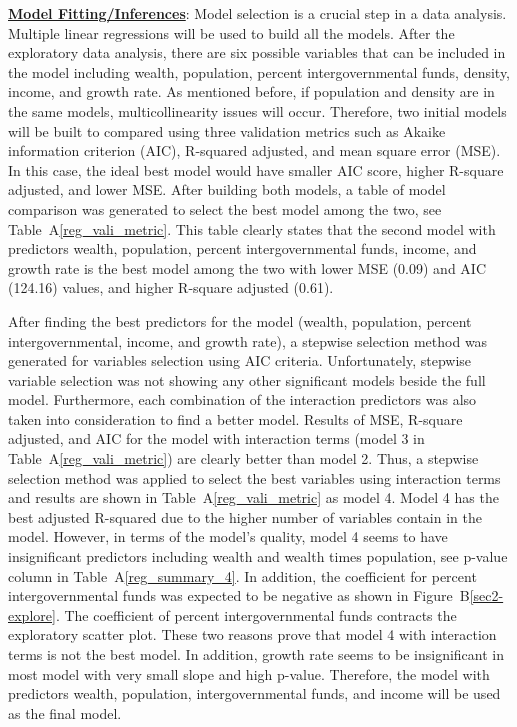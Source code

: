 \documentclass[11pt]{article}\usepackage[]{graphicx}\usepackage[]{color}
\begin{document}
\noindent\textbf{\underline{Model Fitting/Inferences}}: Model selection is a crucial step in a data analysis. Multiple linear regressions will be used to build all the models. After the exploratory data analysis, there are six possible variables that can be included in the model including wealth, population, percent intergovernmental funds, density, income, and growth rate. As mentioned before, if population and density are in the same models, multicollinearity issues will occur. Therefore, two initial models will be built to compared using three validation metrics such as Akaike information criterion (AIC), R-squared adjusted, and mean square error (MSE). In this case, the ideal best model would have smaller AIC score, higher R-square adjusted, and lower MSE. After building both models, a table of model comparison was generated to select the best model among the two, see Table~A\ref{reg_vali_metric}. This table clearly states that the second model with predictors wealth, population, percent intergovernmental funds, income, and growth rate is the best model among the two with lower MSE (0.09) and AIC (124.16) values, and higher R-square adjusted (0.61).
\hfill \break

\noindent After finding the best predictors for the model (wealth, population, percent intergovernmental, income, and growth rate), a stepwise selection method was generated for variables selection using AIC criteria. Unfortunately, stepwise variable selection was not showing any other significant models beside the full model. Furthermore, each combination of the interaction predictors was also taken into consideration to find a better model. Results of MSE, R-square adjusted, and AIC for the model with interaction terms (model 3 in Table~A\ref{reg_vali_metric}) are clearly better than model 2. Thus, a stepwise selection method was applied to select the best variables using interaction terms and results are shown in Table~A\ref{reg_vali_metric} as model 4. Model 4 has the best adjusted R-squared due to the higher number of variables contain in the model. However, in terms of the model's quality, model 4 seems to have insignificant predictors including wealth and wealth times population, see p-value column in Table~A\ref{reg_summary_4}. In addition, the coefficient for percent intergovernmental funds was expected to be negative as shown in Figure~B\ref{sec2-explore}. The coefficient of percent intergovernmental funds contracts the exploratory scatter plot. These two reasons prove that model 4 with interaction terms is not the best model. In addition, growth rate seems to be insignificant in most model with very small slope and high p-value. Therefore, the model with predictors wealth, population, intergovernmental funds, and income will be used as the final model.
\hfill \break
\end{document}
